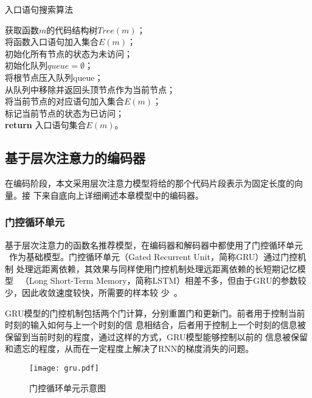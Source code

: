 \begin{algorithm}[H]
\caption{入口语句搜索算法}\label{alg:block}
获取函数$m$的代码结构树$Tree(m)$；\\
将函数入口语句加入集合$E(m)$；\\
初始化所有节点的状态为未访问；\\
初始化队列$queue=\emptyset$；\\
将根节点压入队列queue；\\
 {
    从队列中移除并返回头顶节点作为当前节点；\\
     {
         {
            将当前节点的对应语句加入集合$E(m)$；\\
        }
    }
    标记当前节点的状态为已访问；\\
}
\textbf{return} 入口语句集合$E(m)$。\\
\end{algorithm}




\subsection{基于层次注意力的编码器}
在编码阶段，本文采用层次注意力模型将给的那个代码片段表示为固定长度的向量。接
下来自底向上详细阐述本章模型中的编码器。

\subsubsection{门控循环单元}
基于层次注意力的函数名推荐模型，在编码器和解码器中都使用了门控循环单元
~\cite{Kyunghyun2014Learning}作为基础模型。门控循环单元（Gated Recurrent Unit，简称GRU）通过门控机制
处理远距离依赖，其效果与同样使用门控机制处理远距离依赖的长短期记忆模型~\cite{Hochreiter1997Long}
（Long Short-Term Memory，简称LSTM）相差不多，但由于GRU的参数较少，因此收敛速度较快，所需要的样本较
少~\cite{Chung2014Empirical}。

GRU模型的门控机制包括两个门计算，分别重置门和更新门。前者用于控制当前时刻的输入如何与上一个时刻的信
息相结合，后者用于控制上一个时刻的信息被保留到当前时刻的程度，通过这样的方式，GRU模型能够控制以前的
信息被保留和遗忘的程度，从而在一定程度上解决了RNN的梯度消失的问题。

\begin{figure} [!t]
	\centering
	\texttt{[image: gru.pdf]}
	\caption{门控循环单元示意图}
	\label{fig:gru}
\end{figure}

